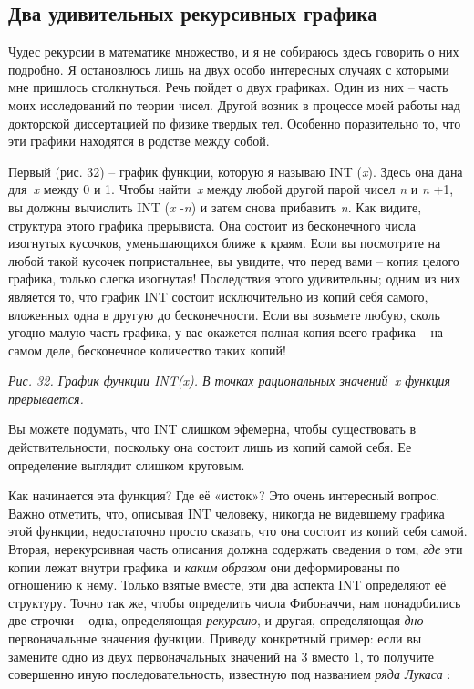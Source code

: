 \documentclass[../main.tex]{subfiles}
\begin{document}
\subsection{Два удивительных рекурсивных графика}

Чудес рекурсии в математике множество, и я не собираюсь здесь говорить о них подробно. Я остановлюсь лишь на двух особо интересных случаях с которыми мне пришлось столкнуться. Речь пойдет о двух графиках. Один из них \--- часть моих исследований по теории чисел. Другой возник в процессе моей работы над докторской диссертацией по физике твердых тел. Особенно поразительно то, что эти графики находятся в родстве между собой.

Первый (рис. 32) \--- график функции, которую я называю INT (\emph{x}). Здесь она дана для~\emph{x} между 0 и 1. Чтобы найти~\emph{x} между любой другой парой чисел \emph{n} и \emph{n} +1, вы должны вычислить INT (\emph{x} -\emph{n}) и затем снова прибавить \emph{n}. Как видите, структура этого графика прерывиста. Она состоит из бесконечного числа изогнутых кусочков, уменьшающихся ближе к краям. Если вы посмотрите на любой такой кусочек попристальнее, вы увидите, что перед вами \--- копия целого графика, только слегка изогнутая! Последствия этого удивительны; одним из них является то, что график INT состоит исключительно из копий себя самого, вложенных одна в другую до бесконечности. Если вы возьмете любую, сколь угодно малую часть графика, у вас окажется полная копия всего графика \--- на самом деле, бесконечное количество таких копий!

\emph{Рис. 32. График функции INT(x). В точках рациональных значений~x функция прерывается.}

Вы можете подумать, что INT слишком эфемерна, чтобы существовать в действительности, поскольку она состоит лишь из копий самой себя. Ее определение выглядит слишком круговым.

Как начинается эта функция? Где её «исток»? Это очень интересный вопрос. Важно отметить, что, описывая INT человеку, никогда не видевшему графика этой функции, недостаточно просто сказать, что она состоит из копий себя самой. Вторая, нерекурсивная часть описания должна содержать сведения о том, \emph{где} эти копии лежат внутри графика~и \emph{каким образом} они деформированы по отношению к нему. Только взятые вместе, эти два аспекта INT определяют её структуру. Точно так же, чтобы определить числа Фибоначчи, нам понадобились две строчки \--- одна, определяющая \emph{рекурсию}, и другая, определяющая \emph{дно} \--- первоначальные значения функции. Приведу конкретный пример: если вы замените одно из двух первоначальных значений на 3 вместо 1, то получите совершенно иную последовательность, известную под названием \emph{ряда Лукаса} :
\end{document}
